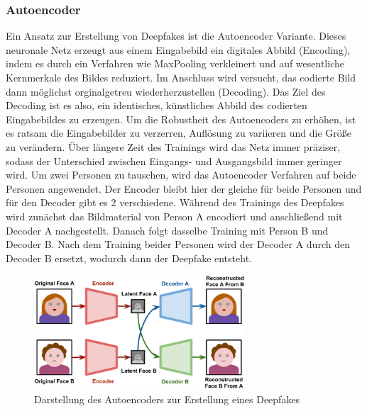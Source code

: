 \subsubsection{Autoencoder}
Ein Ansatz zur Erstellung von Deepfakes ist die Autoencoder Variante. Dieses neuronale Netz erzeugt aus einem Eingabebild ein digitales Abbild (Encoding), indem es durch ein Verfahren wie \gls{MaxPooling} verkleinert und auf wesentliche Kernmerkale des Bildes reduziert. Im Anschluss wird versucht, das codierte Bild dann möglichst orginalgetreu wiederherzustellen (Decoding). Das Ziel des Decoding ist es also, ein identisches, künstliches Abbild des codierten Eingabebildes zu erzeugen. Um die Robustheit des Autoencoders zu erhöhen, ist es ratsam die Eingabebilder zu verzerren, Auflösung zu variieren und die Größe zu verändern.  Über längere Zeit des Trainings wird das Netz immer präziser, sodass der Unterschied zwischen Eingangs- und Ausgangsbild immer geringer wird.\newline
Um zwei Personen zu tauschen, wird das Autoencoder Verfahren auf beide Personen angewendet. Der Encoder bleibt hier der gleiche für beide Personen und für den Decoder gibt es 2 verschiedene. Während des Trainings des Deepfakes wird zunächst das Bildmaterial von Person A encodiert und anschließend mit Decoder A nachgestellt. Danach folgt dasselbe Training mit Person B und Decoder B. Nach dem Training beider Personen wird der Decoder A durch den Decoder B ersetzt, wodurch dann der Deepfake entsteht.\cite{HochschuleDerMedien}
\begin{figure}[H]
    \includegraphics[width=0.7\textwidth]{Bilder/Autoencoder}
    \centering
    \caption{Darstellung des Autoencoders zur Erstellung eines Deepfakes\cite{HochschuleDerMedien}}
    \label{fig:Autoencoder}
\end{figure}

